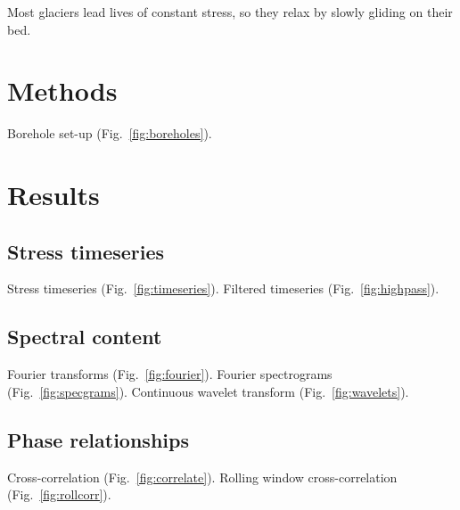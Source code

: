 \documentclass[utf8]{article}
\begin{document}
    Most glaciers lead lives of constant stress, so they relax by slowly
    gliding on their bed.

\section{Methods}

    Borehole set-up (Fig.~\ref{fig:boreholes}).

\section{Results}

\subsection{Stress timeseries}

    Stress timeseries (Fig.~\ref{fig:timeseries}).
    Filtered timeseries (Fig.~\ref{fig:highpass}).

\subsection{Spectral content}

    Fourier transforms (Fig.~\ref{fig:fourier}).
    Fourier spectrograms (Fig.~\ref{fig:specgrams}).
    Continuous wavelet transform (Fig.~\ref{fig:wavelets}).

\subsection{Phase relationships}

    Cross-correlation (Fig.~\ref{fig:correlate}).
    Rolling window cross-correlation (Fig.~\ref{fig:rollcorr}).

\end{document}
